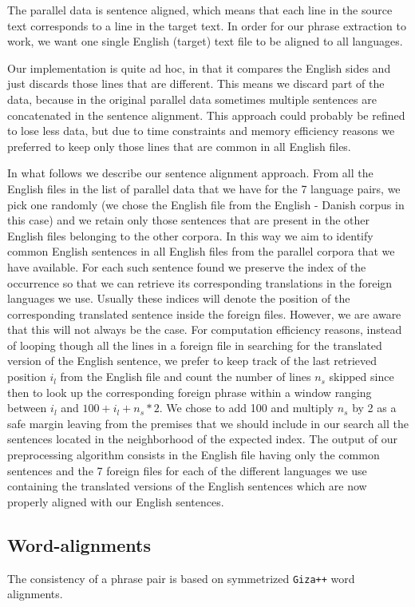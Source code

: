 \documentclass[11pt]{article}
\begin{document}
The parallel data is sentence aligned, which means that each line in the source text corresponds to a line in the target text.
In order for our phrase extraction to work, we want one single English (target) text file to be aligned to all languages.

Our implementation is quite ad hoc, in that it compares the English sides and just discards those lines that are different. This means we discard part of the data, because in the original parallel data sometimes multiple sentences are concatenated in the sentence alignment. This approach could probably be refined to lose less data, but due to time constraints and memory efficiency reasons we preferred to keep only those lines that are common in all English files. 

In what follows we describe our sentence alignment approach. From all the English files in the list of parallel data that we have for the 7 language pairs, we pick one randomly (we chose the English file from the English - Danish corpus in this case) and we retain only those sentences that are present in the other English files belonging to the other corpora. In this way we aim to identify common English sentences in all English files from the parallel corpora that we have available. For each such sentence found we preserve the index of the occurrence so that we can retrieve its corresponding translations in the foreign languages we use. Usually these indices will denote the position of the corresponding translated sentence inside the foreign files. However, we are aware that this will not always be the case. For computation efficiency reasons, instead of looping though all the lines in a foreign file in searching for the translated version of the English sentence, we prefer to keep track of the last retrieved position $i_l$ from the English file and count the number of lines $n_s$ skipped since then to look up the corresponding foreign phrase within a window ranging between $i_l$ and $100 + i_l + n_s*2$. We chose to add 100 and multiply $n_s$ by 2 as a safe margin leaving from the premises that we should include in our search all the sentences located in the neighborhood of the expected index. 
The output of our preprocessing algorithm consists in the English file having only the common sentences and the 7 foreign files for each of the different languages we use containing the translated versions of the English sentences which are now properly aligned with our English sentences. 

\subsection{Word-alignments}
The consistency of a phrase pair is based on symmetrized {\tt Giza++} word alignments.
\end{document}
